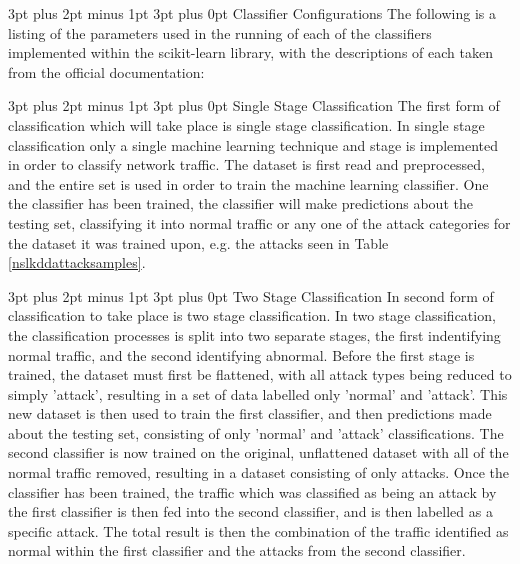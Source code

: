 \documentclass[12pt,a4paper]{article}
\makeatletter
\renewcommand\subsection{\@startsection {subsection}{1}{2mm} %
      {3pt plus 2pt minus 1pt} %
      {3pt plus 0pt} %
      {\normalfont\bfseries}}
\makeatother
\begin{document}
\subsection{Classifier Configurations}
The following is a listing of the parameters used in the running of each of the classifiers implemented within the scikit-learn library, with the descriptions of each taken from the official documentation:



\subsection{Single Stage Classification}
The first form of classification which will take place is single stage classification. In single stage classification only a single machine learning technique and stage is implemented in order to classify network traffic. The dataset is first read and preprocessed, and the entire set is used in order to train the machine learning classifier. One the classifier has been trained, the classifier will make predictions about the testing set, classifying it into normal traffic or any one of the attack categories for the dataset it was trained upon, e.g. the attacks seen in Table \ref{nslkddattacksamples}.

\subsection{Two Stage Classification}
In second form of classification to take place is two stage classification. In two stage classification, the classification processes is split into two separate stages, the first indentifying normal traffic, and the second identifying abnormal. Before the first stage is trained, the dataset must first be flattened, with all attack types being reduced to simply 'attack', resulting in a set of data labelled only 'normal' and 'attack'. This new dataset is then used to train the first classifier, and then predictions made about the testing set, consisting of only 'normal' and 'attack' classifications. The second classifier is now trained on the original, unflattened dataset with all of the normal traffic removed, resulting in a dataset consisting of only attacks. Once the classifier has been trained, the traffic which was classified as being an attack by the first classifier is then fed into the second classifier, and is then labelled as a specific attack. The total result is then the combination of the traffic identified as normal within the first classifier and the attacks from the second classifier. 
\end{document}
